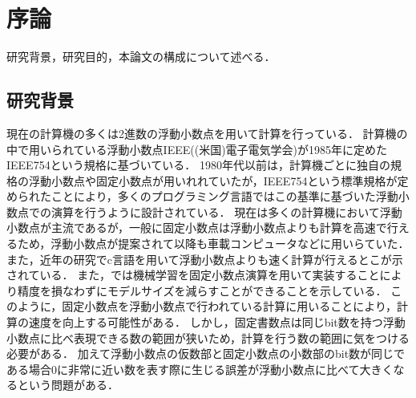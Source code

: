 \chapter{序論}
\label{chap:序論}
研究背景，研究目的，本論文の構成について述べる．
\begin{comment}
    目標規定：
    この修士論文は，固定小数点演算が浮動小数点演算に比べ精度の高い計算を行える場合があることを示すために書く．
\end{comment}
\section{研究背景}
\begin{comment}
    研究テーマにおける既存の知見は何か？
    分かっていないこと、究明すべきことは何か？
    その不足点を究明する意義は何か？
    自分の研究の論拠や仮説は何か？
    
    ストーリー：
    固定小数点演算は浮動小数点演算よりも計算時間が速いとされている．
    しかし，浮動小数点に比べて精度が低くなる恐れがある．
    本論文では，固定小数点と浮動小数点での数値計算の結果を比べ，固定小数点での演算も浮動小数点と同程度の精度で計算できることを示した．
    実験結果より固定小数点演算で浮動小数点より高速で，浮動小数点と同程度の計算を実現できるのではないかと考える．
\end{comment}
現在の計算機の多くは2進数の浮動小数点を用いて計算を行っている．
計算機の中で用いられている浮動小数点IEEE((米国)電子電気学会)が1985年に定めたIEEE754という規格に基づいている．
1980年代以前は，計算機ごとに独自の規格の浮動小数点や固定小数点が用いれれていたが，IEEE754という標準規格が定められたことにより，多くのプログラミング言語ではこの基準に基づいた浮動小数点での演算を行うように設計されている．
現在は多くの計算機において浮動小数点が主流であるが，一般に固定小数点は浮動小数点よりも計算を高速で行えるため，浮動小数点が提案されて以降も車載コンピュータなどに用いらていた．
また，近年の研究でc言語を用いて浮動小数点よりも速く計算が行えるとこが示されている\cite{IJERTV12IS010134}．
また，\cite{pmlr-v48-linb16}では機械学習を固定小数点演算を用いて実装することにより精度を損なわずにモデルサイズを減らすことができることを示している．
このように，固定小数点を浮動小数点で行われている計算に用いることにより，計算の速度を向上する可能性がある．
しかし，固定書数点は同じbit数を持つ浮動小数点に比べ表現できる数の範囲が狭いため，計算を行う数の範囲に気をつける必要がある．
加えて浮動小数点の仮数部と固定小数点の小数部のbit数が同じである場合$0$に非常に近い数を表す際に生じる誤差が浮動小数点に比べて大きくなるという問題がある．


